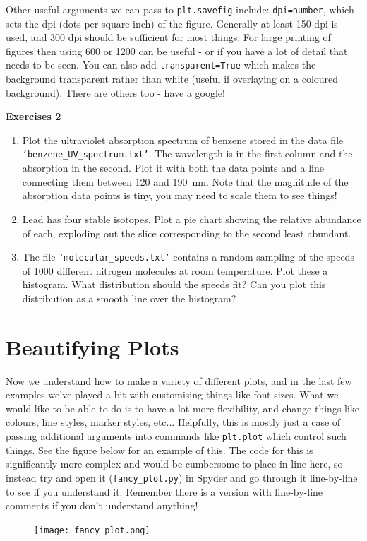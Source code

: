 \documentclass[10pt,a4paper]{memoir}
\begin{document}
Other useful arguments we can pass to \texttt{plt.savefig} include: \texttt{dpi=number}, which sets the dpi (dots per square inch) of the figure. Generally at least 150 dpi is used, and 300 dpi should be sufficient for most things. For large printing of figures then using 600 or 1200 can be useful - or if you have a lot of detail that needs to be seen. You can also add \texttt{transparent=True} which makes the background transparent rather than white (useful if overlaying on a coloured background). There are others too - have a google!

\noindent \textbf{Exercises 2}
\begin{enumerate}
	\item Plot the ultraviolet absorption spectrum of benzene stored in the data file \texttt{`benzene\_UV\_spectrum.txt'}. The wavelength is in the first column and the absorption in the second. Plot it with both the data points and a line connecting them between 120 and \SI{190}{\nano\metre}. Note that the magnitude of the absorption data points is tiny, you may need to scale them to see things! 
	\item Lead has four stable isotopes. Plot a pie chart showing the relative abundance of each, exploding out the slice corresponding to the second least abundant.
	\item The file \texttt{`molecular\_speeds.txt'} contains a random sampling of the speeds of 1000 different nitrogen molecules at room temperature. Plot these a histogram. What distribution should the speeds fit? Can you plot this distribution as a smooth line over the histogram?
\end{enumerate}
\newpage

\section{Beautifying Plots}
Now we understand how to make a variety of different plots, and in the last few examples we've played a bit with customising things like font sizes. What we would like to be able to do is to have a lot more flexibility, and change things like colours, line styles, marker styles, etc... Helpfully, this is mostly just a case of passing additional arguments into commands like \texttt{plt.plot} which control such things. See the figure below for an example of this. The code for this is significantly more complex and would be cumbersome to place in line here, so instead try and open it (\texttt{fancy\_plot.py}) in Spyder and go through it line-by-line to see if you understand it. Remember there is a version with line-by-line comments if you don't understand anything!
\begin{figure}[h!]
	\centering
	\texttt{[image: fancy\_plot.png]}
\end{figure}
\end{document}
